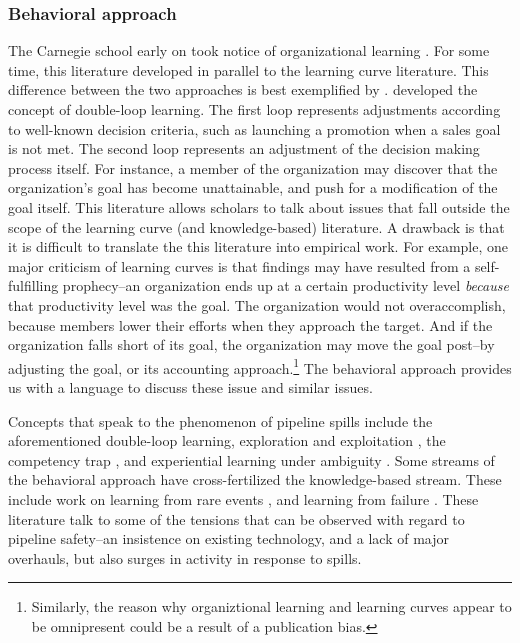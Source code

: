 

\subsubsection{Behavioral approach}

The Carnegie school early on took notice of organizational learning \citep[e.g., ][]{March1963}. For some time, this literature developed in parallel to the learning curve literature. This difference between the two approaches is best exemplified by \citet{Argyris1978}. \citet{Argyris1978} developed the concept of double-loop learning. The first loop represents adjustments according to well-known decision criteria, such as launching a promotion when a sales goal is not met. The second loop represents an adjustment of the decision making process itself. For instance, a member of the organization may discover that the organization's goal has become unattainable, and push for a modification of the goal itself. This literature allows scholars to talk about issues that fall outside the scope of the learning curve (and knowledge-based) literature. A drawback is that it is difficult to translate the this literature into empirical work. For example, one major criticism of learning curves is that findings may have resulted from a self-fulfilling prophecy--an organization ends up at a certain productivity level \textit{because} that productivity level was the goal. The organization would not overaccomplish, because members lower their efforts when they approach the target. And if the organization falls short of its goal, the organization may move the goal post--by adjusting the goal, or its accounting approach.\footnote{Similarly, the reason why organiztional learning and learning curves appear to be omnipresent could be a result of a publication bias.} The behavioral approach provides us with a language to discuss these issue and similar issues. 

Concepts that speak to the phenomenon of pipeline spills include the aforementioned double-loop learning, exploration and exploitation \citep{March1991}, the competency trap \citep{Levitt1988}, and experiential learning under ambiguity \citep{March1975}. Some streams of the behavioral approach have cross-fertilized the knowledge-based stream. These include work on learning from rare events \citep{March1991b, Maslach2018}, and learning from failure \citep[e.g.,][]{Madsen2010}. These literature talk to some of the tensions that can be observed with regard to pipeline safety--an insistence on existing technology, and a lack of major overhauls, but also surges in activity in response to spills.



